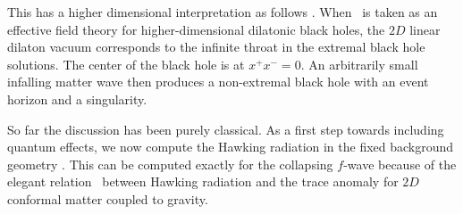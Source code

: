 This has a higher dimensional interpretation
as follows \HoSt. When \one\ is taken
as an effective field theory for higher-dimensional dilatonic black
holes, the $2D$ linear dilaton vacuum corresponds to the infinite throat in
the extremal black hole solutions.
The center of the black hole is at $x^+x^-=0$.
An arbitrarily small infalling matter wave then produces a non-extremal
black hole with an event horizon and a singularity.

So far the discussion has been purely classical.  As a first step
towards including quantum effects, we now compute the Hawking radiation
in the fixed background geometry \eleven.  This can be computed exactly for
the collapsing $f$-wave because of the elegant relation \CF\ between
Hawking radiation and the trace anomaly for $2D$ conformal
matter coupled to gravity.

